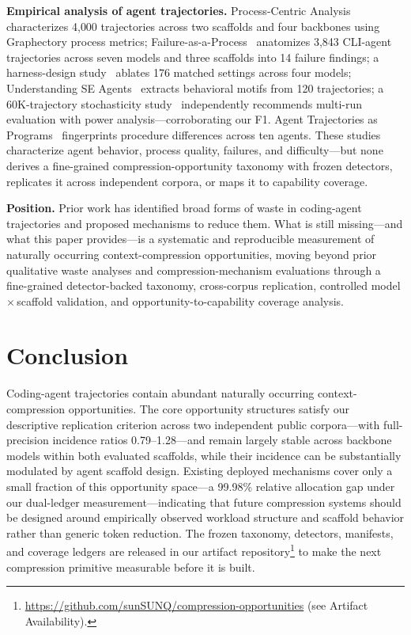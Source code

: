 ﻿\documentclass[sigconf,balance=false]{acmart}
\begin{document}
\textbf{Empirical analysis of agent trajectories.} Process-Centric Analysis~\cite{processcentric2025} characterizes 4{,}000 trajectories across two scaffolds and four backbones using Graphectory process metrics; Failure-as-a-Process~\cite{failureprocess2026} anatomizes 3{,}843 CLI-agent trajectories across seven models and three scaffolds into 14 failure findings; a harness-design study~\cite{harnessdesign2026} ablates 176 matched settings across four models; Understanding SE Agents~\cite{understandingseagents2025} extracts behavioral motifs from 120 trajectories; a 60K-trajectory stochasticity study~\cite{randomness2026} independently recommends multi-run evaluation with power analysis---corroborating our F1. Agent Trajectories as Programs~\cite{trajectoriesprograms2026} fingerprints procedure differences across ten agents. These studies characterize agent behavior, process quality, failures, and difficulty---but none derives a fine-grained compression-opportunity taxonomy with frozen detectors, replicates it across independent corpora, or maps it to capability coverage.

\textbf{Position.} Prior work has identified broad forms of waste in coding-agent trajectories and proposed mechanisms to reduce them. What is still missing---and what this paper provides---is a systematic and reproducible measurement of naturally occurring context-compression opportunities, moving beyond prior qualitative waste analyses and compression-mechanism evaluations through a fine-grained detector-backed taxonomy, cross-corpus replication, controlled model\,$\times$\,scaffold validation, and opportunity-to-capability coverage analysis.

\section{Conclusion}

Coding-agent trajectories contain abundant naturally occurring context-compression opportunities. The core opportunity structures satisfy our descriptive replication criterion across two independent public corpora---with full-precision incidence ratios 0.79--1.28---and remain largely stable across backbone models within both evaluated scaffolds, while their incidence can be substantially modulated by agent scaffold design. Existing deployed mechanisms cover only a small fraction of this opportunity space---a 99.98\% relative allocation gap under our dual-ledger measurement---indicating that future compression systems should be designed around empirically observed workload structure and scaffold behavior rather than generic token reduction. The frozen taxonomy, detectors, manifests, and coverage ledgers are released in our artifact repository\footnote{\url{https://github.com/sunSUNQ/compression-opportunities} (see Artifact Availability).} to make the next compression primitive measurable before it is built.
\end{document}

